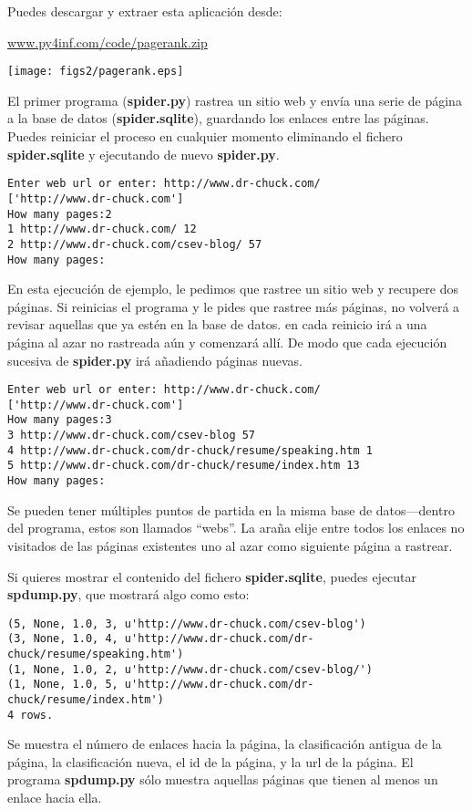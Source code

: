 Puedes descargar y extraer esta aplicación desde:

\url{www.py4inf.com/code/pagerank.zip}

\beforefig
\centerline{\texttt{[image: figs2/pagerank.eps]}}
\afterfig

El primer programa ({\bf spider.py}) rastrea un sitio web
y envía una serie de página a la
base de datos ({\bf spider.sqlite}), guardando los enlaces entre las páginas.
Puedes reiniciar el proceso en cualquier momento eliminando el
fichero {\bf spider.sqlite} y ejecutando de nuevo {\bf spider.py}.

\beforeverb
\begin{verbatim}
Enter web url or enter: http://www.dr-chuck.com/
['http://www.dr-chuck.com']
How many pages:2
1 http://www.dr-chuck.com/ 12
2 http://www.dr-chuck.com/csev-blog/ 57
How many pages:
\end{verbatim}
\afterverb
%
En esta ejecución de ejemplo, le pedimos que rastree un sitio web y recupere dos
páginas. Si reinicias el programa y le pides que rastree más
páginas, no volverá a revisar aquellas que ya estén en la base de datos.
en cada reinicio irá a una página al azar no rastreada aún y comenzará allí.
De modo que cada ejecución sucesiva de {\bf spider.py} irá añadiendo páginas nuevas.

\beforeverb
\begin{verbatim}
Enter web url or enter: http://www.dr-chuck.com/
['http://www.dr-chuck.com']
How many pages:3
3 http://www.dr-chuck.com/csev-blog 57
4 http://www.dr-chuck.com/dr-chuck/resume/speaking.htm 1
5 http://www.dr-chuck.com/dr-chuck/resume/index.htm 13
How many pages:
\end{verbatim}
\afterverb
%
Se pueden tener múltiples puntos de partida en la misma base de datos---dentro
del programa, estos son llamados ``webs''. La araña
elije entre todos los enlaces no visitados de las páginas existentes uno al azar
como siguiente página a rastrear.

Si quieres mostrar el contenido del fichero {\bf spider.sqlite}, puedes
ejecutar {\bf spdump.py}, que mostrará algo como esto:

\beforeverb
\begin{verbatim}
(5, None, 1.0, 3, u'http://www.dr-chuck.com/csev-blog')
(3, None, 1.0, 4, u'http://www.dr-chuck.com/dr-chuck/resume/speaking.htm')
(1, None, 1.0, 2, u'http://www.dr-chuck.com/csev-blog/')
(1, None, 1.0, 5, u'http://www.dr-chuck.com/dr-chuck/resume/index.htm')
4 rows.
\end{verbatim}
\afterverb
%
Se muestra el número de enlaces hacia la página, la clasificación antigua de la página, la
clasificación nueva, el id de la página, y la url de la página. El programa {\bf spdump.py}
sólo muestra aquellas páginas que tienen al menos un enlace hacia ella.

